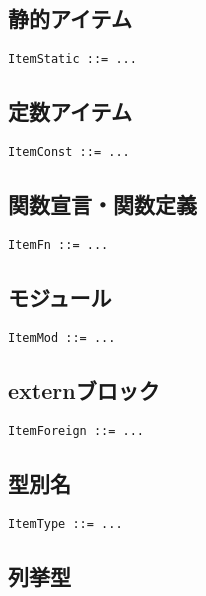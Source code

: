 \documentclass[dvipdfmx,uplatex,papersize,a4paper,10pt]{jsbook}
\theoremstyle{definition}
\begin{document}
\subsection{静的アイテム}

\begin{lstlisting}[language=BNFLike, gobble=2]
  ItemStatic ::= ...
\end{lstlisting}

\subsection{定数アイテム}

\begin{lstlisting}[language=BNFLike, gobble=2]
  ItemConst ::= ...
\end{lstlisting}

\subsection{関数宣言・関数定義}

\begin{lstlisting}[language=BNFLike, gobble=2]
  ItemFn ::= ...
\end{lstlisting}

\subsection{モジュール}

\begin{lstlisting}[language=BNFLike, gobble=2]
  ItemMod ::= ...
\end{lstlisting}

\subsection{externブロック}

\begin{lstlisting}[language=BNFLike, gobble=2]
  ItemForeign ::= ...
\end{lstlisting}

\subsection{型別名}

\begin{lstlisting}[language=BNFLike, gobble=2]
  ItemType ::= ...
\end{lstlisting}

\subsection{列挙型}
\end{document}
